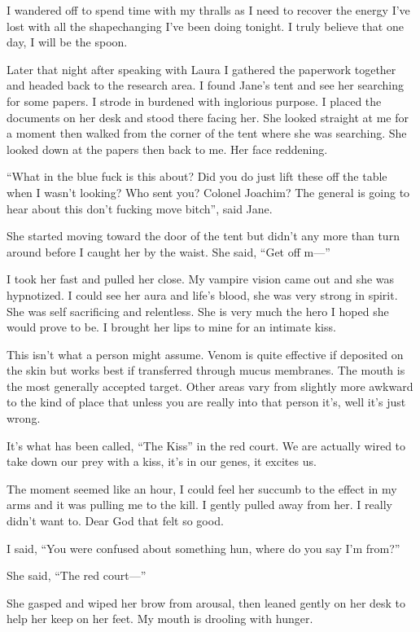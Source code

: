 I wandered off to spend time with my thralls as I need to recover the energy I've lost with all the shapechanging I've been doing tonight. I truly believe that one day, I will be the spoon.

\parasep

Later that night after speaking with Laura I gathered the paperwork together and headed back to the research area. I found Jane's tent and see her searching for some papers. I strode in burdened with inglorious purpose. I placed the documents on her desk and stood there facing her. She looked straight at me for a moment then walked from the corner of the tent where she was searching. She looked down at the papers then back to me. Her face reddening.

``What in the blue fuck is this about? Did you do just lift these off the table when I wasn't looking? Who sent you? Colonel Joachim? The general is going to hear about this don't fucking move bitch'', said Jane.

She started moving toward the door of the tent but didn't any more than turn around before I caught her by the waist. She said, ``Get off m---''

I took her fast and pulled her close. My vampire vision came out and she was hypnotized. I could see her aura and life's blood, she was very strong in spirit. She was self sacrificing and relentless. She is very much the hero I hoped she would prove to be. I brought her lips to mine for an intimate kiss. 

This isn't what a person might assume. Venom is quite effective if deposited on the skin but works best if transferred through mucus membranes. The mouth is the most generally accepted target. Other areas vary from slightly more awkward to the kind of place that unless you are really into that person it's, well it's just wrong.

It's what has been called, ``The Kiss'' in the red court. We are actually wired to take down our prey with a kiss, it's in our genes, it excites us.

The moment seemed like an hour, I could feel her succumb to the effect in my arms and it was pulling me to the kill. I gently pulled away from her. I really didn't want to. Dear God that felt so good.

I said, ``You were confused about something hun, where do you say I'm from?''

She said, ``The red court---''

She gasped and wiped her brow from arousal, then leaned gently on her desk to help her keep on her feet. My mouth is drooling with hunger.

